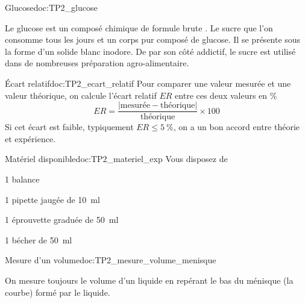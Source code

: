 \begin{doc}{Glucose}{doc:TP2_glucose}
  \begin{wrapfigure}{r}{0.3\linewidth}
    \vspace{-30pt}
    \centering
    \chemfigHaworth{!\glucoseHaw}
  \end{wrapfigure}
  
  Le glucose est un composé chimique de formule brute .
  Le sucre que l'on consomme tous les jours et un corps pur composé de glucose.
  Il se présente sous la forme d'un solide blanc inodore.
  De par son côté addictif, le sucre est utilisé dans de nombreuses préparation agro-alimentaire.
\end{doc}


\begin{doc}{Écart relatif}{doc:TP2_ecart_relatif}
  Pour comparer une valeur mesurée et une valeur théorique, on calcule l'écart relatif $ER$ entre ces deux valeurs en \unit{\percent}
  \begin{equation*}
    ER = \dfrac{|\text{mesurée} - \text{théorique}|}{\text{théorique}} \times 100
  \end{equation*}
  Si cet écart est faible, typiquement $ER \leq \qty{5}{\percent}$, on a un bon accord entre théorie et expérience.
\end{doc}

\begin{multicols}{2}
  \begin{doc}{Matériel disponible}{doc:TP2_materiel_exp}
    Vous disposez de
    \begin{listePoints}
      \item 1 balance
      \item 1 pipette jaugée de \qty{10}{\ml}
      \item 1 éprouvette graduée de \qty{50}{\ml}
      \item 1 bécher de \qty{50}{\ml}
    \end{listePoints}
  \end{doc}
    
  \begin{doc}{Mesure d'un volume}{doc:TP2_mesure_volume_menisque}
    \begin{wrapfigure}{l}{0.48\linewidth}  
      \centering
      \vspace*{-18pt}
    \end{wrapfigure}
    On mesure toujours le volume d'un liquide en repérant le bas du ménisque (la courbe) formé par le liquide.
  \end{doc}
\end{multicols}

